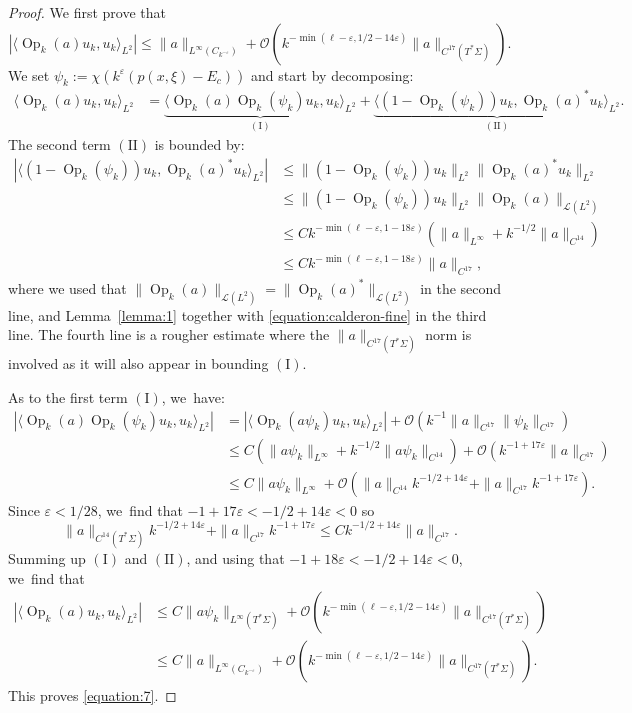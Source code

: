 \documentclass[10pt]{amsart}
\theoremstyle{plain}
\theoremstyle{definition}
\let\mc\mathcal
\let\eps\varepsilon
\DeclareMathOperator{\Op}{Op}
\begin{document}
\begin{proof}
We first prove that
\begin{equation}
\label{equation:7}
|\langle\Op_k(a)u_k,u_k\rangle_{L^2}| \leq \|a\|_{L^{\infty}(C_{k^{-\eps}})} + \mc{O}(k^{-\min(\ell-\eps, 1/2-14\eps)}\|a\|_{C^{17}(T^*\Sigma)}).
\end{equation}
We set $\psi_k := \chi(k^\eps (p(x,\xi)-E_c))$ and start by decomposing:
\[
\begin{split}
\langle \Op_k(a)u_k,u_k\rangle_{L^2} & = \underbrace{\langle \Op_k(a)\Op_k(\psi_k) u_k,u_k\rangle_{L^2}}_{\mathrm{(I)}} + \underbrace{\langle (1-\Op_k(\psi_k))u_k,\Op_k(a)^*u_k\rangle_{L^2}}_{\mathrm{(II)}}.
\end{split}
\]
The second term $\mathrm{(II)}$ is bounded by:
\[
\begin{split}
|\langle (1-\Op_k(\psi_k))u_k,\Op_k(a)^*u_k\rangle_{L^2}| & \leq \|(1-\Op_k(\psi_k))u_k\|_{L^2} \|\Op_k(a)^*u_k\|_{L^2} \\
& \leq \|(1-\Op_k(\psi_k))u_k\|_{L^2} \|\Op_k(a)\|_{\mathcal{L}(L^2)} \\
& \leq C k^{-\min(\ell-\eps,1-18\eps)} (\|a\|_{L^\infty} + k^{-1/2}\|a\|_{C^{14}}) \\
& \leq Ck^{-\min(\ell-\eps,1-18\eps)}\|a\|_{C^{17}},
\end{split}
\]
where we used that $\|\Op_k(a)\|_{\mathcal{L}(L^2)} = \|\Op_k(a)^*\|_{\mathcal{L}(L^2)}$
in the second line, and Lem\-ma~\ref{lemma:1} together with
\eqref{equation:calderon-fine} in the third line. The fourth line is a rougher estimate where the $\|a\|_{C^{17}(T^*\Sigma)}$ norm is involved as it will also appear in bounding $\mathrm{(I)}$.

As to the first term $\mathrm{(I)}$, we~have:
\[
\begin{split}
|\langle \Op_k(a)\Op_k(\psi_k) u_k,u_k\rangle_{L^2}| &= |\langle \Op_k(a\psi_k)u_k,u_k\rangle_{L^2}| + \mc{O}(k^{-1}\|a\|_{C^{17}}\|\psi_k\|_{C^{17}}) \\
& \leq C(\|a\psi_k\|_{L^\infty} + k^{-1/2}\|a\psi_k\|_{C^{14}}) + \mc{O}(k^{-1+17\eps}\|a\|_{C^{17}}) \\
& \leq C \|a\psi_k\|_{L^\infty} + \mc{O}(\|a\|_{C^{14}}k^{-1/2+14\eps}+\|a\|_{C^{17}}k^{-1+17\eps}).
\end{split}
\]
Since $\eps < 1/28$, we~find that $-1+17\eps < -1/2 + 14\eps < 0$ so
\[
\|a\|_{C^{14}(T^*\Sigma)}k^{-1/2+14\eps}+\|a\|_{C^{17}}k^{-1+17\eps} \leq C k^{-1/2+14\eps} \|a\|_{C^{17}}.
\]
Summing up $\mathrm{(I)}$ and $\mathrm{(II)}$, and using that $-1+18\eps < -1/2+14\eps < 0$, we~find that
\[
\begin{split}
| \langle \Op_k(a)u_k,u_k\rangle_{L^2}| &\leq C \|a\psi_k\|_{L^\infty(T^*\Sigma)} + \mc{O}(k^{-\min(\ell-\eps, 1/2-14\eps)}\|a\|_{C^{17}(T^*\Sigma)}) \\
& \leq C \|a\|_{L^\infty(C_{k^{-\eps}})} + \mc{O}(k^{-\min(\ell-\eps, 1/2-14\eps)}\|a\|_{C^{17}(T^*\Sigma)}).
\end{split}
\]
This proves \eqref{equation:7}.


\end{proof}
\end{document}

